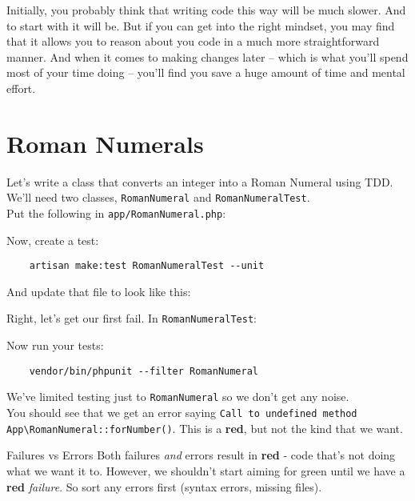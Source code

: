 Initially, you probably think that writing code this way will be much slower. And to start with it will be. But if you can get into the right mindset, you may find that it allows you to reason about you code in a much more straightforward manner. And when it comes to making changes later – which is what you'll spend most of your time doing – you'll find you save a huge amount of time and mental effort.

\section{Roman Numerals}

Let's write a class that converts an integer into a Roman Numeral using TDD.
\\

We'll need two classes, \texttt{RomanNumeral} and \texttt{RomanNumeralTest}.
\\

Put the following in \texttt{app/RomanNumeral.php}:



Now, create a test:

\begin{verbatim}
    artisan make:test RomanNumeralTest --unit
\end{verbatim}

And update that file to look like this:



Right, let's get our first fail. In \texttt{RomanNumeralTest}:


Now run your tests:

\begin{verbatim}
    vendor/bin/phpunit --filter RomanNumeral
\end{verbatim}

We've limited testing just to \texttt{RomanNumeral} so we don't get any noise.
\\

You should see that we get an error saying \texttt{Call to undefined method \\ App\textbackslash{}RomanNumeral::forNumber()}. This is a \textbf{red}, but not the kind that we want.

\pagebreak

\begin{infobox}{Failures vs Errors}
    Both failures \textit{and} errors result in \textbf{red} - code that's not doing what we want it to. However, we shouldn't start aiming for green until we have a \textbf{red} \textit{failure}. So sort any errors first (syntax errors, missing files).
\end{infobox}


